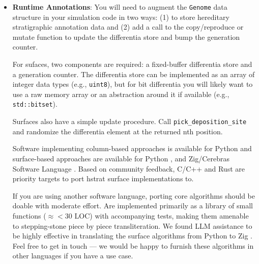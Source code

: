 \begin{itemize}
\item \textbf{Runtime Annotations}:
You will need to augment the \texttt{Genome} data structure in your simulation code in two ways: (1) to store hereditary stratigraphic annotation data and (2) add a call to the copy/reproduce or mutate function to update the differentia store and bump the generation counter.

For sufaces, two components are required: a fixed-buffer differentia store and a generation counter.
The differentia store can be implemented as an array of integer data types (e.g., \texttt{uint8}), but for bit differentia you will likely want to use a raw memory array or an abstraction around it if available (e.g., \texttt{std::bitset}).

Surfaces also have a simple update procedure.
Call \texttt{pick\_deposition\_site} and randomize the differentia element at the returned nth position.

Software implementing column-based approaches is available for Python \citep{moreno2022hstrat} and surface-based approaches are available for Python \citep{TODO}, and Zig/Cerebras Software Language \citep{TODO}.
Based on community feedback, C/C++ and Rust are priority targets to port hstrat surface implementations to.

If you are using another software language, porting core algorithms should be doable with moderate effort.
Are implemented primarily as a library of small functions ($\approx<30$ LOC) with accompanying tests, making them amenable to stepping-stone piece by piece transliteration.
We found LLM assistance to be highly effective in translating the surface algorithms from Python to Zig \citep{TODO}.
Feel free to get in touch --- we would be happy to furnish these algorithms in other languages if you have a use case.
\end{itemize}

